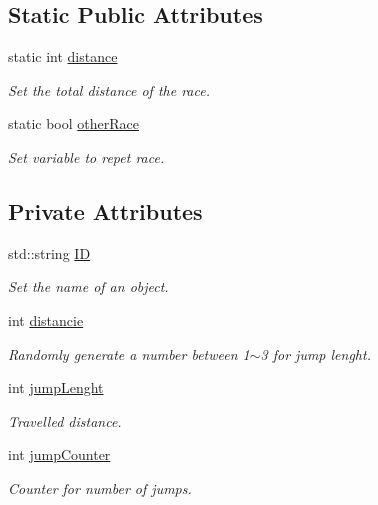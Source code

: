 \subsection*{Static Public Attributes}
\begin{DoxyCompactItemize}
\item 
static int \hyperlink{classFrog_a5846a1d18091a9d5409cd7ab3a93abdf}{distance}
\begin{DoxyCompactList}\small\item\em Set the total distance of the race. \end{DoxyCompactList}\item 
static bool \hyperlink{classFrog_a3069c74fde5e33eb58c40c655b1ad8f7}{other\+Race}
\begin{DoxyCompactList}\small\item\em Set variable to repet race. \end{DoxyCompactList}\end{DoxyCompactItemize}
\subsection*{Private Attributes}
\begin{DoxyCompactItemize}
\item 
std\+::string \hyperlink{classFrog_ac2fe938591f6471cbea049b87dbc2a2e}{ID}
\begin{DoxyCompactList}\small\item\em Set the name of an object. \end{DoxyCompactList}\item 
int \hyperlink{classFrog_acfa2696ff1e9483acfc3c60941a9a540}{distancie}
\begin{DoxyCompactList}\small\item\em Randomly generate a number between 1$\sim$3 for jump lenght. \end{DoxyCompactList}\item 
int \hyperlink{classFrog_a8ce20ccfa8a10afc1465a2c60e33b53d}{jump\+Lenght}
\begin{DoxyCompactList}\small\item\em Travelled distance. \end{DoxyCompactList}\item 
int \hyperlink{classFrog_a3d38d6ca4384c9d2cb4b770d93cf7dd5}{jump\+Counter}
\begin{DoxyCompactList}\small\item\em Counter for number of jumps. \end{DoxyCompactList}\end{DoxyCompactItemize}


